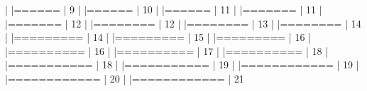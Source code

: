 \documentclass[article,nojss]{jss} %
\begin{document}
\begin{Schunk}
\begin{Soutput}
  |                                                                  
  |======                                                      |   9%
  |                                                                  
  |======                                                      |  10%
  |                                                                  
  |======                                                      |  11%
  |                                                                  
  |=======                                                     |  11%
  |                                                                  
  |=======                                                     |  12%
  |                                                                  
  |========                                                    |  12%
  |                                                                  
  |========                                                    |  13%
  |                                                                  
  |========                                                    |  14%
  |                                                                  
  |=========                                                   |  14%
  |                                                                  
  |=========                                                   |  15%
  |                                                                  
  |=========                                                   |  16%
  |                                                                  
  |==========                                                  |  16%
  |                                                                  
  |==========                                                  |  17%
  |                                                                  
  |==========                                                  |  18%
  |                                                                  
  |===========                                                 |  18%
  |                                                                  
  |===========                                                 |  19%
  |                                                                  
  |============                                                |  19%
  |                                                                  
  |============                                                |  20%
  |                                                                  
  |============                                                |  21%

\end{Soutput}
\end{Schunk}
\end{document}
